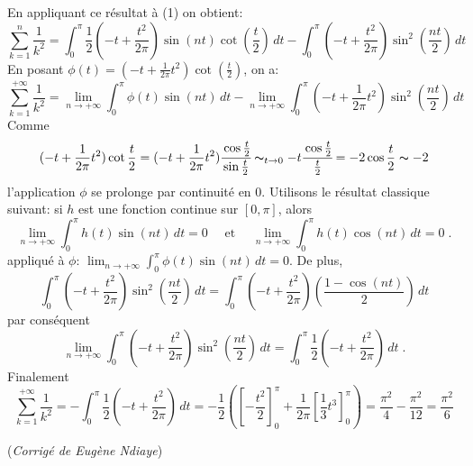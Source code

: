 {{En appliquant ce résultat à (1) on obtient:
\[  
\sum_{k = 1}^{n} \frac{1}{k^2} 
=  \int_{0}^{\pi} \frac{1}{2} \left(-t + \frac{t^2}{2\pi} \right) \sin(nt)\cot \left( \frac{t}{2} \right) \, dt 
- \int_{0}^{\pi} \left(-t + \frac{t^2}{2\pi} \right) \sin^2 \left(\frac{nt}{2} \right) \, dt  
\] 
En posant $ \phi (t) = (-t + \frac{1}{2\pi} t^2)\cot(\frac{t}{2}) $, on a:
\[ \sum_{k = 1}^{+\infty} \frac{1}{k^2} 
= \lim_{n \to +\infty} \int_{0}^{\pi} \phi (t)\sin(nt)\, dt 
- \lim_{n \to +\infty}\int_{0}^{\pi} \left(-t + \frac{1}{2\pi} t^2 \right) \sin^2 \left(\frac{nt}{2} \right) \, dt 
\]
Comme
\[ 
(-t + \frac{1}{2\pi} t^2)\cot \frac{t}{2}
= (-t + \frac{1}{2\pi} t^2) \cfrac{\cos \frac{t}{2}}{\sin \frac{t}{2}}  
\thicksim_{t \to 0} - t \cfrac{\cos \frac{t}{2}} {\frac{t}{2}} = - 2 \cos \frac{t}{2}
\thicksim - 2
\] 
l'application $\phi$ se prolonge par continuité en $0$.
Utilisons le résultat classique suivant: si $h$ est une fonction continue sur $[0, \pi]$, alors
\[ 
\lim_{n \to +\infty} \int_{0}^{\pi} h(t)\sin(nt)\, dt = 0 \quad \text{ et } \quad
\lim_{n \to +\infty} \int_{0}^{\pi} h(t)\cos(nt)\, dt = 0 \; .
\]
appliqué à $\phi$: $\lim_{n \to +\infty} \int_{0}^{\pi} \phi (t)\sin(nt)\, dt = 0$.
De plus, \[ \int_{0}^{\pi} \left(-t + \frac{t^2}{2\pi} \right) \sin^2 \left(\frac{nt}{2} \right) \, dt 
          = \int_{0}^{\pi} \left(-t + \frac{t^2}{2\pi} \right) \left(\frac{1 - \cos(nt)}{2} \right)\, dt 
\]
par conséquent 
\[
\lim_{n \to +\infty} \int_{0}^{\pi} \left(-t + \frac{t^2}{2\pi} \right) \sin^2 \left( \frac{nt}{2} \right) \, dt 
= \int_{0}^{\pi} \frac{1}{2} \left( -t + \frac{t^2}{2\pi} \right) \, dt \; .
\]
Finalement
\[ 
\sum_{k = 1}^{+\infty} \frac{1}{k^2} 
= - \int_{0}^{\pi} \frac{1}{2} \left(-t + \frac{t^2}{2\pi} \right) \, dt 
= -\frac{1}{2} \left( \left[ -\frac{t^2}{2} \right]_{0}^{\pi} + \frac{1}{2\pi} 
\left[ \frac{1}{3}t^3 \right]_{0}^{\pi} \right) 
= \frac{\pi^2}{4} - \frac{\pi^2}{12} = \frac{\pi^2}{6}
\]

\medskip

(\emph{Corrigé de Eugène Ndiaye})
}
}
